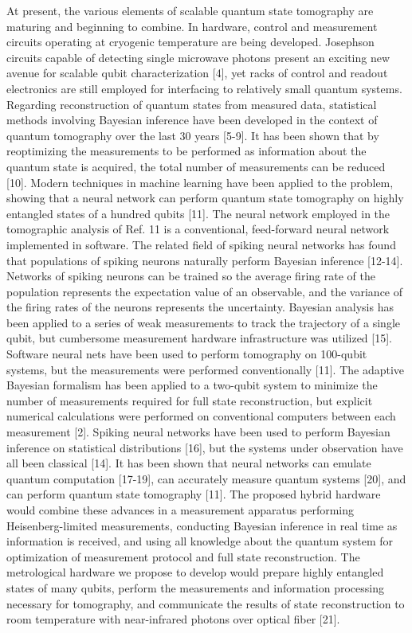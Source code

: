 \documentclass[twocolumn]{article}
\begin{document}
At present, the various elements of scalable quantum state tomography are maturing and beginning to combine. In hardware, control and measurement circuits operating at cryogenic temperature are being developed. Josephson circuits capable of detecting single microwave photons present an exciting new avenue for scalable qubit characterization [4], yet racks of control and readout electronics are still employed for interfacing to relatively small quantum systems. Regarding reconstruction of quantum states from measured data, statistical methods involving Bayesian inference have been developed in the context of quantum tomography over the last 30 years [5-9]. It has been shown that by reoptimizing the measurements to be performed as information about the quantum state is acquired, the total number of measurements can be reduced [10]. Modern techniques in machine learning have been applied to the problem, showing that a neural network can perform quantum state tomography on highly entangled states of a hundred qubits [11]. The neural network employed in the tomographic analysis of Ref. 11 is a conventional, feed-forward neural network implemented in software. The related field of spiking neural networks has found that populations of spiking neurons naturally perform Bayesian inference [12-14]. Networks of spiking neurons can be trained so the average firing rate of the population represents the expectation value of an observable, and the variance of the firing rates of the neurons represents the uncertainty. Bayesian analysis has been applied to a series of weak measurements to track the trajectory of a single qubit, but cumbersome measurement hardware infrastructure was utilized [15]. Software neural nets have been used to perform tomography on 100-qubit systems, but the measurements were performed conventionally [11]. The adaptive Bayesian formalism has been applied to a two-qubit system to minimize the number of measurements required for full state reconstruction, but explicit numerical calculations were performed on conventional computers between each measurement [2]. Spiking neural networks have been used to perform Bayesian inference on statistical distributions [16], but the systems under observation have all been classical [14]. It has been shown that neural networks can emulate quantum computation [17-19], can accurately measure quantum systems [20], and can perform quantum state tomography [11]. The proposed hybrid hardware would combine these advances in a measurement apparatus performing Heisenberg-limited measurements, conducting Bayesian inference in real time as information is received, and using all knowledge about the quantum system for optimization of measurement protocol and full state reconstruction. The metrological hardware we propose to develop would prepare highly entangled states of many qubits, perform the measurements and information processing necessary for tomography, and communicate the results of state reconstruction to room temperature with near-infrared photons over optical fiber [21].
\end{document}

